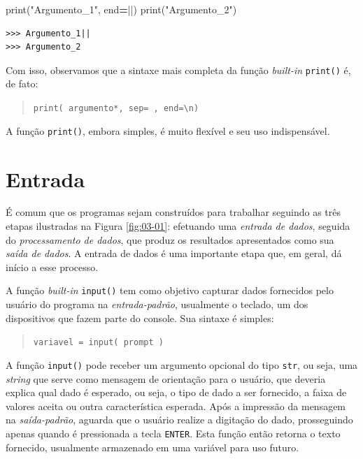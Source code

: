 \documentclass[
]{book}
\newenvironment{Shaded}{\begin{snugshade}}{\end{snugshade}}
\newcommand{\BuiltInTok}[1]{#1}
\newcommand{\NormalTok}[1]{#1}
\newcommand{\OperatorTok}[1]{\textcolor[rgb]{0.81,0.36,0.00}{\textbf{#1}}}
\newcommand{\StringTok}[1]{\textcolor[rgb]{0.31,0.60,0.02}{#1}}
\begin{document}
\begin{Shaded}
\begin{Highlighting}[]
\BuiltInTok{print}\NormalTok{(}\StringTok{"Argumento\_1"}\NormalTok{, end}\OperatorTok{=}\StringTok{\textquotesingle{}||\textquotesingle{}}\NormalTok{)}
\BuiltInTok{print}\NormalTok{(}\StringTok{"Argumento\_2"}\NormalTok{)}
\end{Highlighting}
\end{Shaded}

\begin{verbatim}
>>> Argumento_1||
>>> Argumento_2
\end{verbatim}

Com isso, observamos que a sintaxe mais completa da função \emph{built-in} \texttt{print()} é, de fato:

\begin{quote}
\texttt{print(\ argumento*,\ sep=\textquotesingle{}\ \textquotesingle{},\ end=\textquotesingle{}\textbackslash{}n\textquotesingle{})}
\end{quote}

A função \texttt{print()}, embora simples, é muito flexível e seu uso indispensável.

\hypertarget{e-s-entra}{%
\section{Entrada}\label{e-s-entra}}

É comum que os programas sejam construídos para trabalhar seguindo as três etapas ilustradas na Figura \ref{fig:03-01}: efetuando uma \emph{entrada de dados}, seguida do \emph{processamento de dados}, que produz os resultados apresentados como sua \emph{saída de dados}. A entrada de dados é uma importante etapa que, em geral, dá início a esse processo.

A função \emph{built-in} \texttt{input()} tem como objetivo capturar dados fornecidos pelo usuário do programa na \emph{entrada-padrão}, usualmente o teclado, um dos dispositivos que fazem parte do console. Sua sintaxe é simples:

\begin{quote}
\texttt{variavel\ =\ input(\ prompt\ )}
\end{quote}

A função \texttt{input()} pode receber um argumento opcional do tipo \texttt{str}, ou seja, uma \emph{string} que serve como mensagem de orientação para o usuário, que deveria explica qual dado é esperado, ou seja, o tipo de dado a ser fornecido, a faixa de valores aceita ou outra característica esperada. Após a impressão da mensagem na \emph{saída-padrão}, aguarda que o usuário realize a digitação do dado, prosseguindo apenas quando é pressionada a tecla \texttt{ENTER}. Esta função então retorna o texto fornecido, usualmente armazenado em uma variável para uso futuro.
\end{document}
